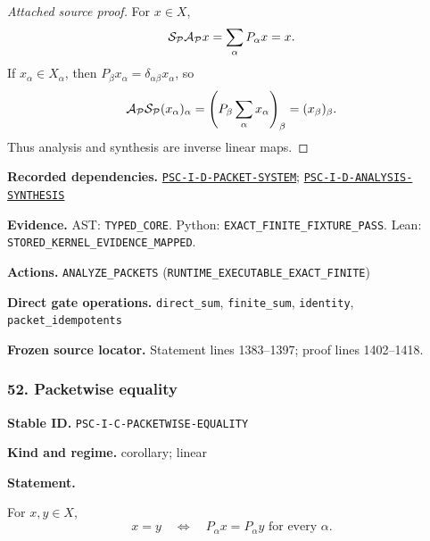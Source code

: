 \documentclass[a4paper,11pt]{article}
\newcommand{\field}[2]{\noindent\textbf{#1.} #2\par}
\begin{document}
\begin{proof}[Attached source proof]
For $x\in X$,
\[
\mathcal S_{\mathcal P}\mathcal A_{\mathcal P}x
=
\sum_\alpha P_\alpha x
=x.
\]
If $x_\alpha\in X_\alpha$, then $P_\beta x_\alpha=\delta_{\alpha\beta}x_\alpha$, so
\[
\mathcal A_{\mathcal P}\mathcal S_{\mathcal P}(x_\alpha)_\alpha
=
\left(P_\beta\sum_\alpha x_\alpha\right)_\beta
=(x_\beta)_\beta.
\]
Thus analysis and synthesis are inverse linear maps.
\end{proof}
\field{Recorded dependencies}{\hyperref[rec:PSC-I-D-PACKET-SYSTEM]{\nolinkurl{PSC-I-D-PACKET-SYSTEM}}; \hyperref[rec:PSC-I-D-ANALYSIS-SYNTHESIS]{\nolinkurl{PSC-I-D-ANALYSIS-SYNTHESIS}}}
\field{Evidence}{AST: \nolinkurl{TYPED_CORE}. Python: \nolinkurl{EXACT_FINITE_FIXTURE_PASS}. Lean: \nolinkurl{STORED_KERNEL_EVIDENCE_MAPPED}.}
\field{Actions}{\nolinkurl{ANALYZE_PACKETS} (\nolinkurl{RUNTIME_EXECUTABLE_EXACT_FINITE})}
\field{Direct gate operations}{\nolinkurl{direct_sum}, \nolinkurl{finite_sum}, \nolinkurl{identity}, \nolinkurl{packet_idempotents}}
\field{Frozen source locator}{Statement lines 1383--1397; proof lines 1402--1418.}
\subsubsection*{52. Packetwise equality}
\label{rec:PSC-I-C-PACKETWISE-EQUALITY}
\field{Stable ID}{\nolinkurl{PSC-I-C-PACKETWISE-EQUALITY}}
\field{Kind and regime}{corollary; linear}
\textbf{Statement.}\par
For $x,y\in X$,
\[
x=y
\quad\Longleftrightarrow\quad
P_\alpha x=P_\alpha y\text{ for every }\alpha.
\]
\end{document}
